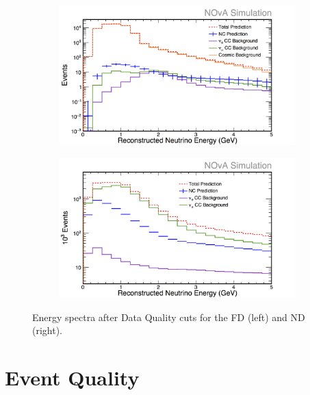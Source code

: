 \begin{figure}[h]
  \centering
  \begin{subfigure}{.48\textwidth}
    \centering
    \includegraphics[width=1\linewidth]{figures/RecoE0FD.png}
  \end{subfigure}
  \begin{subfigure}{.48\textwidth}
    \centering
    \includegraphics[width=1\linewidth]{figures/RecoE0ND.png}
  \end{subfigure}
  \caption[Energy Spectra After Data Quality Cuts]{Energy spectra after Data Quality cuts for the FD (left) and ND (right).}
  \label{fig:NP1DataQual}
\end{figure}

\section{Event Quality}

